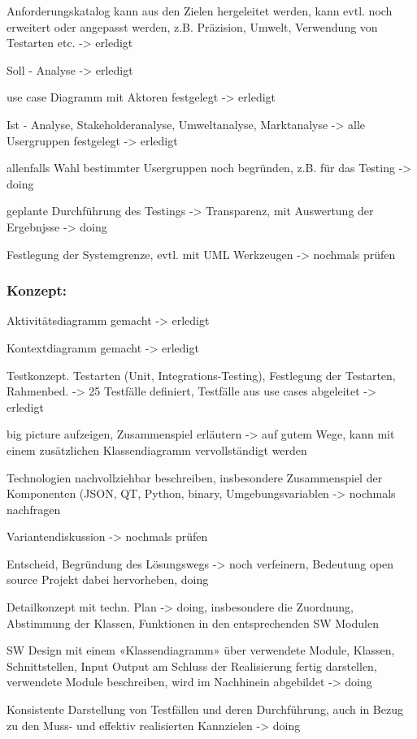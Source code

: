 \documentclass[a4paper,11pt]{article}
\begin{document}
Anforderungskatalog kann aus den Zielen hergeleitet werden, kann evtl. noch
erweitert oder angepasst werden, z.B. Präzision, Umwelt, Verwendung von
Testarten etc. -> erledigt

Soll - Analyse -> erledigt

use case Diagramm mit Aktoren festgelegt -> erledigt

Ist - Analyse, Stakeholderanalyse, Umweltanalyse, Marktanalyse -> alle
Usergruppen festgelegt -> erledigt

allenfalls Wahl bestimmter Usergruppen noch begründen, z.B. für das Testing
-> doing

geplante Durchführung des Testings -> Transparenz, mit Auswertung der
Ergebnjsse -> doing

Festlegung der Systemgrenze, evtl. mit UML Werkzeugen -> nochmals prüfen

\subsubsection*{Konzept:}
\label{sec:org758371d}

Aktivitätsdiagramm gemacht -> erledigt

Kontextdiagramm gemacht -> erledigt

Testkonzept. Testarten (Unit, Integrations-Testing), Festlegung der
Testarten, Rahmenbed. -> 25 Testfälle definiert, Testfälle aus use cases
abgeleitet -> erledigt

big picture aufzeigen, Zusammenspiel erläutern -> auf gutem Wege, kann mit
einem zusätzlichen Klassendiagramm vervollständigt werden

Technologien nachvollziehbar beschreiben, insbesondere Zusammenspiel der
Komponenten (JSON, QT, Python, binary, Umgebungsvariablen -> nochmals
nachfragen

Variantendiskussion -> nochmals prüfen

Entscheid, Begründung des Lösungswegs -> noch verfeinern, Bedeutung open
source Projekt dabei hervorheben, doing

Detailkonzept mit techn. Plan -> doing, insbesondere die Zuordnung,
Abstimmung der Klassen, Funktionen in den entsprechenden SW Modulen

SW Design mit einem «Klassendiagramm» über verwendete Module, Klassen,
Schnittstellen, Input Output am Schluss der Realisierung fertig darstellen,
verwendete Module beschreiben, wird im Nachhinein abgebildet -> doing

Konsistente Darstellung von Testfällen und deren Durchführung, auch in Bezug
zu den Muss- und effektiv realisierten Kannzielen -> doing
\end{document}
